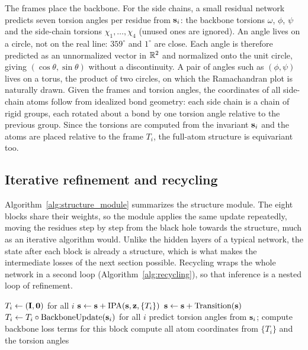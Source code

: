 The frames place the backbone. For the side chains, a small residual network predicts seven torsion angles per residue from $\mathbf{s}_i$: the backbone torsions $\omega$, $\phi$, $\psi$ and the side-chain torsions $\chi_1,\dots,\chi_4$ (unused ones are ignored). An angle lives on a circle, not on the real line: $359^\circ$ and $1^\circ$ are close. Each angle is therefore predicted as an unnormalized vector in $\mathbb{R}^2$ and normalized onto the unit circle, giving $(\cos\theta,\sin\theta)$ without a discontinuity. A pair of angles such as $(\phi,\psi)$ lives on a torus, the product of two circles, on which the Ramachandran plot is naturally drawn. Given the frames and torsion angles, the coordinates of all side-chain atoms follow from idealized bond geometry: each side chain is a chain of rigid groups, each rotated about a bond by one torsion angle relative to the previous group. Since the torsions are computed from the invariant $\mathbf{s}_i$ and the atoms are placed relative to the frame $T_i$, the full-atom structure is equivariant too.

\subsection{Iterative refinement and recycling}

Algorithm~\ref{alg:structure_module} summarizes the structure module. The eight blocks share their weights, so the module applies the same update repeatedly, moving the residues step by step from the black hole towards the structure, much as an iterative algorithm would. Unlike the hidden layers of a typical network, the state after each block is already a structure, which is what makes the intermediate losses of the next section possible. Recycling wraps the whole network in a second loop (Algorithm~\ref{alg:recycling}), so that inference is a nested loop of refinement.

\begin{algorithm}[!htbp]
  \caption{Structure module (simplified). $\vs_i\in\R^{D_s}$ and $\vz_{ij}\in\R^{D_z}$ come from the Evoformer.}
  \label{alg:structure_module}
  \begin{algorithmic}[1]
    \State $T_i\gets(\mathbf{I},\mathbf{0})$ for all $i$ 
     
      \State $\mathbf{s} \gets \mathbf{s} + \text{IPA}(\mathbf{s},\mathbf{z},\{T_i\})$ 
      \State $\mathbf{s} \gets \mathbf{s} + \text{Transition}(\mathbf{s})$
      \State $T_i \gets T_i\circ\text{BackboneUpdate}(\mathbf{s}_i)$ for all $i$ 
      \State predict torsion angles from $\mathbf{s}_i$; compute backbone loss terms for this block
    \EndFor
    \State compute all atom coordinates from $\{T_i\}$ and the torsion angles
  \end{algorithmic}
\end{algorithm}

